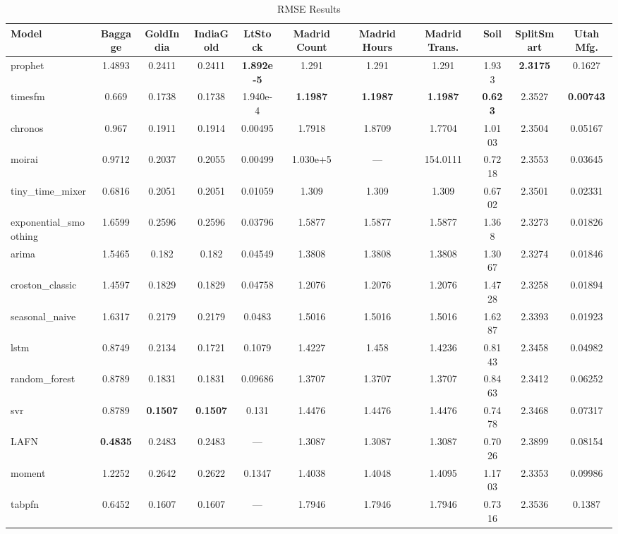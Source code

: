 \begin{table}
\centering
\caption{RMSE Results}
\label{tab:rmse}
\begin{adjustbox}{width=0.95\textheight,center}
\small
\begin{tabular}{lcccccccccc}
\toprule
Model & Baggage & GoldIndia & IndiaGold & LtStock & Madrid Count & Madrid Hours & Madrid Trans. & Soil & SplitSmart & Utah Mfg. \\
\midrule
prophet & 1.4893 & 0.2411 & 0.2411 & \textbf{1.892e-5} & 1.291 & 1.291 & 1.291 & 1.933 & \textbf{2.3175} & 0.1627 \\
timesfm & 0.669 & 0.1738 & 0.1738 & 1.940e-4 & \textbf{1.1987} & \textbf{1.1987} & \textbf{1.1987} & \textbf{0.623} & 2.3527 & \textbf{0.00743} \\
chronos & 0.967 & 0.1911 & 0.1914 & 0.00495 & 1.7918 & 1.8709 & 1.7704 & 1.0103 & 2.3504 & 0.05167 \\
moirai & 0.9712 & 0.2037 & 0.2055 & 0.00499 & 1.030e+5 & --- & 154.0111 & 0.7218 & 2.3553 & 0.03645 \\
tiny\_time\_mixer & 0.6816 & 0.2051 & 0.2051 & 0.01059 & 1.309 & 1.309 & 1.309 & 0.6702 & 2.3501 & 0.02331 \\
exponential\_smoothing & 1.6599 & 0.2596 & 0.2596 & 0.03796 & 1.5877 & 1.5877 & 1.5877 & 1.368 & 2.3273 & 0.01826 \\
arima & 1.5465 & 0.182 & 0.182 & 0.04549 & 1.3808 & 1.3808 & 1.3808 & 1.3067 & 2.3274 & 0.01846 \\
croston\_classic & 1.4597 & 0.1829 & 0.1829 & 0.04758 & 1.2076 & 1.2076 & 1.2076 & 1.4728 & 2.3258 & 0.01894 \\
seasonal\_naive & 1.6317 & 0.2179 & 0.2179 & 0.0483 & 1.5016 & 1.5016 & 1.5016 & 1.6287 & 2.3393 & 0.01923 \\
lstm & 0.8749 & 0.2134 & 0.1721 & 0.1079 & 1.4227 & 1.458 & 1.4236 & 0.8143 & 2.3458 & 0.04982 \\
random\_forest & 0.8789 & 0.1831 & 0.1831 & 0.09686 & 1.3707 & 1.3707 & 1.3707 & 0.8463 & 2.3412 & 0.06252 \\
svr & 0.8789 & \textbf{0.1507} & \textbf{0.1507} & 0.131 & 1.4476 & 1.4476 & 1.4476 & 0.7478 & 2.3468 & 0.07317 \\
LAFN & \textbf{0.4835} & 0.2483 & 0.2483 & --- & 1.3087 & 1.3087 & 1.3087 & 0.7026 & 2.3899 & 0.08154 \\
moment & 1.2252 & 0.2642 & 0.2622 & 0.1347 & 1.4038 & 1.4048 & 1.4095 & 1.1703 & 2.3353 & 0.09986 \\
tabpfn & 0.6452 & 0.1607 & 0.1607 & --- & 1.7946 & 1.7946 & 1.7946 & 0.7316 & 2.3536 & 0.1387 \\

\end{tabular}
\end{adjustbox}
\end{table}
